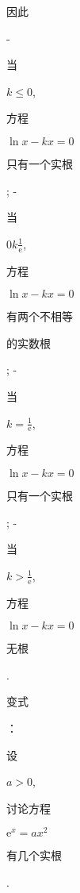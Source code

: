 \documentclass[10pt]{article}
\begin{document}
\begin{CJK}{UTF8}{mj}因此\end{CJK} - \begin{CJK}{UTF8}{mj}当\end{CJK} $k \leq 0$, \begin{CJK}{UTF8}{mj}方程\end{CJK} $\ln x-k x=0$ \begin{CJK}{UTF8}{mj}只有一个实根\end{CJK}; - \begin{CJK}{UTF8}{mj}当\end{CJK} $0 k \frac{1}{\mathrm{e}}$, \begin{CJK}{UTF8}{mj}方程\end{CJK} $\ln x-k x=0$ \begin{CJK}{UTF8}{mj}有两个不相等\end{CJK} \begin{CJK}{UTF8}{mj}的实数根\end{CJK}; - \begin{CJK}{UTF8}{mj}当\end{CJK} $k=\frac{1}{\mathrm{e}}$, \begin{CJK}{UTF8}{mj}方程\end{CJK} $\ln x-k x=0$ \begin{CJK}{UTF8}{mj}只有一个实根\end{CJK}; - \begin{CJK}{UTF8}{mj}当\end{CJK} $k>\frac{1}{\mathrm{e}}$, \begin{CJK}{UTF8}{mj}方程\end{CJK} $\ln x-k x=0$ \begin{CJK}{UTF8}{mj}无根\end{CJK}. \begin{CJK}{UTF8}{mj}变式\end{CJK}：\begin{CJK}{UTF8}{mj}设\end{CJK} $a>0$, \begin{CJK}{UTF8}{mj}讨论方程\end{CJK} $\mathrm{e}^{x}=a x^{2}$ \begin{CJK}{UTF8}{mj}有几个实根\end{CJK}.
\end{document}
